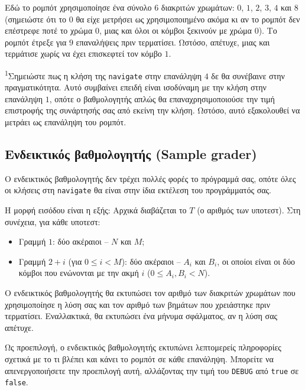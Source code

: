 \documentclass[12pt]{article}
\begin{document}
Εδώ το ρομπότ χρησιμοποίησε ένα σύνολο $6$ διακριτών χρωμάτων: $0$, $1$, $2$, $3$, $4$ και $8$ (σημειώστε ότι το $0$ θα είχε μετρήσει ως χρησιμοποιημένο ακόμα κι αν το ρομπότ δεν επέστρεφε ποτέ το χρώμα $0$, μιας και όλοι οι κόμβοι ξεκινούν με χρώμα $0$). Το ρομπότ έτρεξε για $9$ επαναλήψεις πριν τερματίσει. Ωστόσο, απέτυχε, μιας και τερμάτισε χωρίς να έχει επισκεφτεί τον κόμβο $1$.

\textsuperscript{1}Σημειώστε πως η κλήση της \texttt{navigate} στην επανάληψη $4$ δε θα συνέβαινε στην πραγματικότητα. Αυτό συμβαίνει επειδή είναι ισοδύναμη με την κλήση στην επανάληψη $1$, οπότε ο βαθμολογητής απλώς θα επαναχρησιμοποιούσε την τιμή επιστροφής της συνάρτησής σας από εκείνη την κλήση. Ωστόσο, αυτό εξακολουθεί να μετράει ως επανάληψη του ρομπότ.

\subsection{Ενδεικτικός βαθμολογητής (Sample grader)}

Ο ενδεικτικός βαθμολογητής δεν τρέχει πολλές φορές το πρόγραμμά σας, οπότε όλες οι κλήσεις στη \texttt{navigate} θα είναι στην ίδια εκτέλεση του προγράμματός σας.

Η μορφή εισόδου είναι η εξής: Αρχικά διαβάζεται το $T$ (ο αριθμός των υποτεστ). Στη συνέχεια, για κάθε υποτεστ:
\begin{itemize}
\item Γραμμή $1$: δύο ακέραιοι -- $N$ και $M$;
\item Γραμμή $2+i$ (για $0 \leq i < M$): δύο ακέραιοι -- $A_i$ και $B_i$, οι οποίοι είναι οι δύο κόμβοι που ενώνονται με την ακμή $i$ ($0 \leq A_i, B_i < N$).
\end{itemize}

Ο ενδεικτικός βαθμολογητής θα εκτυπώσει τον αριθμό των διακριτών χρωμάτων που χρησιμοποίησε η λύση σας και τον αριθμό των βημάτων που χρειάστηκε πριν τερματίσει. Εναλλακτικά, θα εκτυπώσει ένα μήνυμα σφάλματος, αν η λύση σας απέτυχε.

Ως προεπιλογή, ο ενδεικτικός βαθμολογητής εκτυπώνει λεπτομερείς πληροφορίες σχετικά με το τι βλέπει και κάνει το ρομπότ σε κάθε επανάληψη. Μπορείτε να απενεργοποιήσετε την προεπιλογή αυτή, αλλάζοντας την τιμή του \texttt{DEBUG} από \texttt{true} σε \texttt{false}.
\end{document}
